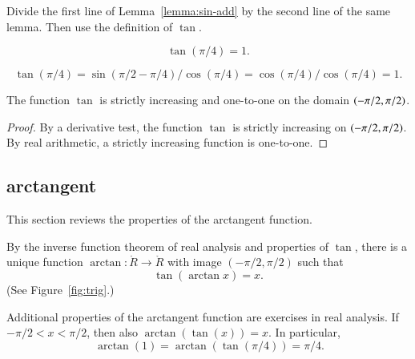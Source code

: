 \begin{proved}
  Divide the first line of Lemma~\ref{lemma:sin-add} by the second
  line of the same lemma.  Then use the definition
  of $\tan$.  \swallowed\end{proved}

\begin{lemma}[]\label{lemma:tan-pi4}
\[ \tan(\pi/4) = 1.\] 
\end{lemma}

\begin{proved}  
\[ 
\tan(\pi/4) = \sin(\pi/2-\pi/4)/\cos(\pi/4) 
  =
  \cos(\pi/4)/\cos(\pi/4) = 1.
\] 
\swallowed\end{proved}

\begin{lemma}[]\label{lemma:tan-monotone}
The function $\tan$ is strictly increasing and one-to-one on the domain
$(-\pi/2,\pi/2)$.
\end{lemma}

\begin{proof} By a derivative test, the function $\tan$ is strictly
  increasing on $(-\pi/2,\pi/2)$.  By
  real arithmetic, a strictly increasing
  function is one-to-one.
\end{proof}

\subsection{arctangent}

This section reviews the properties of the arctangent function.  

\begin{definition}[arctangent]\label{def:arctan}
  By the inverse function theorem of real
    analysis and properties of $\tan$,
  there is a unique function $\arctan:\ring{R}\to\ring{R}$ with image
  $(-\pi/2,\pi/2)$ such that
\begin{equation}\label{eqn:tanarctan}\tan(\arctan x) =x.\end{equation}
(See Figure~\ref{fig:trig}.)
%
\end{definition}
%


Additional properties of the arctangent function are exercises in
real analysis.  If $-\pi/2 < x < \pi/2$,
then also $\arctan(\tan(x)) = x$. In particular,%
\begin{equation}\label{eqn:arctan-1}\
\arctan(1) = \arctan(\tan(\pi/4)) = \pi/4.
\end{equation}


